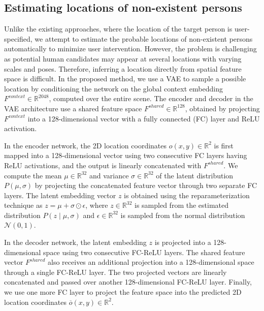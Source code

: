 \subsection{Estimating locations of non-existent persons}
\label{sec:method_location}
Unlike the existing approaches, where the location of the target person is user-specified, we attempt to estimate the probable locations of non-existent persons automatically to minimize user intervention. However, the problem is challenging as potential human candidates may appear at several locations with varying scales and poses. Therefore, inferring a location directly from spatial feature space is difficult. In the proposed method, we use a VAE to sample a possible location by conditioning the network on the global context embedding $F^{context} \in \mathbb{R}^{2048}$, computed over the entire scene. The encoder and decoder in the VAE architecture use a shared feature space $F^{shared} \in \mathbb{R}^{128}$, obtained by projecting $F^{context}$ into a 128-dimensional vector with a fully connected (FC) layer and ReLU activation.

In the encoder network, the 2D location coordinates $o(x, y) \in \mathbb{R}^2$ is first mapped into a 128-dimensional vector using two consecutive FC layers having ReLU activations, and the output is linearly concatenated with $F^{shared}$. We compute the mean $\mu \in \mathbb{R}^{32}$ and variance $\sigma \in \mathbb{R}^{32}$ of the latent distribution $P(\mu, \sigma)$ by projecting the concatenated feature vector through two separate FC layers. The latent embedding vector $z$ is obtained using the reparameterization technique \cite{kingma2013auto} as $z = \mu + \sigma \odot \epsilon$, where $z \in \mathbb{R}^{32}$ is sampled from the estimated distribution $P(z \; | \; \mu, \sigma)$ and $\epsilon \in \mathbb{R}^{32}$ is sampled from the normal distribution $\mathcal{N}(0, 1)$.

In the decoder network, the latent embedding $z$ is projected into a 128-dimensional space using two consecutive FC-ReLU layers. The shared feature vector $F^{shared}$ also receives an additional projection into a 128-dimensional space through a single FC-ReLU layer. The two projected vectors are linearly concatenated and passed over another 128-dimensional FC-ReLU layer. Finally, we use one more FC layer to project the feature space into the predicted 2D location coordinates $\overline{o}(x, y) \in \mathbb{R}^2$.

